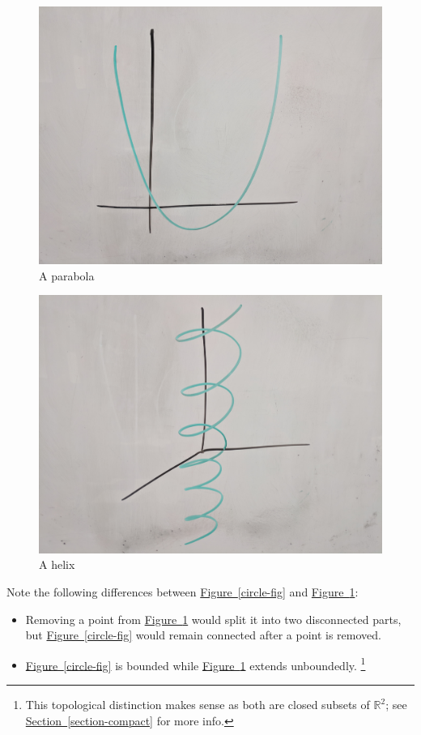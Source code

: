 \documentclass[10pt,]{article}
\begin{document}
\begin{figure}
\centering
\includegraphics[width=1\linewidth]{images/parabola.jpg}
\caption{A parabola\label{figure-parabola}}
\end{figure}
\begin{figure}
\centering
\includegraphics[width=1\linewidth]{images/helix.jpg}
\caption{A helix\label{figure-helix}}
\end{figure}
\hypertarget{p-9}{}%
Note the following differences between \hyperref[circle-fig]{Figure~\ref{circle-fig}} and \hyperref[figure-parabola]{Figure~\ref{figure-parabola}}:%
\leavevmode%
\begin{itemize}[label=\textbullet]
\item{}Removing a point from \hyperref[figure-parabola]{Figure~\ref{figure-parabola}} would split it into two disconnected parts, but \hyperref[circle-fig]{Figure~\ref{circle-fig}} would remain connected after a point is removed.%
\item{}\hyperref[circle-fig]{Figure~\ref{circle-fig}} is bounded while \hyperref[figure-parabola]{Figure~\ref{figure-parabola}} extends unboundedly. \footnote{This topological distinction makes sense as both are closed subsets of \(\mathbb R^2\); see \hyperref[section-compact]{Section~\ref{section-compact}} for more info.\label{fn-1}}%
\end{itemize}
\end{document}

